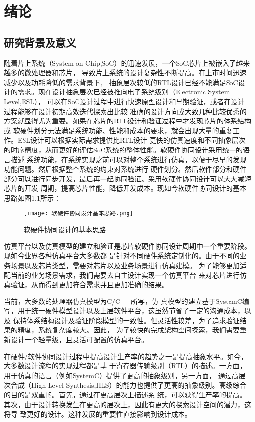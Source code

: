 
\chapter{绪论}

\section{研究背景及意义}
随着片上系统（System on Chip,SoC）的迅速发展，一个SoC芯片上被嵌入了越来越多的微处理器和芯片，
导致片上系统的设计复杂性不断提高。在上市时间迅速减少以及功耗降低的需求背景下，
抽象层次较低的RTL设计已经不能满足SoC设计的需求。现在设计抽象层次已经被推向电子系统级别（Electronic System Level,ESL），
可以在SoC设计过程中进行快速原型设计和早期验证\cite{1}，或者在设计过程能够在设计初期高效迭代探索出比较
准确的设计方向或大致几种比较优秀的方案就显得尤为重要。如果在芯片的RTL设计和验证过程中才发现芯片的体系结构或
软硬件划分无法满足系统功能、性能和成本的要求，就会出现大量的重复工作。ESL设计可以根据实际需求提供比RTL设计
更快的仿真速度和不同抽象层次的时序精度，从而更好的评估SoC系统的整体性能。软硬件协同设计采用统一的语言描述
系统功能，在系统实现之前可以对整个系统进行仿真，以便于尽早的发现功能问题。然后根据整个系统的约束对系统进行
硬件划分。然后软件部分和硬件部分可以进行同步开发，最后再一起协同验证。采用软硬件协同设计可以大大减短芯片的开发
周期，提高芯片性能，降低开发成本。现如今软硬件协同设计的基本思路如图1.1所示：
\begin{figure}
    \centering
    \texttt{[image: 软硬件协同设计基本思路.png]}
    \caption{软硬件协同设计的基本思路}
    \label{fig:badge}
\end{figure}

仿真平台以及仿真模型的建立和验证是芯片软硬件协同设计周期中一个重要阶段。现如今业界各种仿真平台大多数都
是针对不同硬件系统定制化的。由于不同的业务场景以及芯片类型，需要对芯片以及业务场景进行仿真建模。
为了能够更加适配当前的业务场景需求，我们需要去自主设计实现一个仿真平台
来对芯片进行仿真验证，从而得到更加符合需求并且更加准确的结果。

当前，大多数的处理器仿真模型为C/C++所写，仿
真模型的建立基于SystemC\cite{2}编写，用于统一硬件模型设计以及上层软件平台，这虽然节省了一定的沟通成本，以及
保持体系结构设计及验证阶段模型的一致性。但灵活性较差，为了追求验证结果的精度，系统复杂度较大。因此，
为了较快的完成架构空间探索，我们需要重新设计一个轻量级，且灵活可配置的仿真平台。

在硬件/软件协同设计过程\cite{3}中提高设计生产率的趋势之一是提高抽象水平。如今，大多数设计流程的实现过程都是基
于寄存器传输级别（RTL）的描述。一方面，用于仿真的语言（例如SystemC）提供了更高的抽象级别，另一方面，
通过高层次合成（High Level Synthesis,HLS）\cite{4}的能力也提供了更高的抽象级别。高级综合的目的是双重的。首先，通过在更高层次上描述系
统，可以获得生产率的提高。其次，由于设计转换发生在更高的层次上，因此有更大的探索设计空间的潜力，这将导
致更好的设计。这种发展的重要性直接影响到设计成本。


